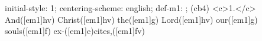 initial-style: 1;
centering-scheme: english;
def-m1: \grealign;
(cb4) <c>1.</c> And([em1]hv) Christ([em1]hv) the([em1]g) Lord([em1]hv) our([em1]g) souls([em1]f) ex-([em1]e)cites,([em1]fv)